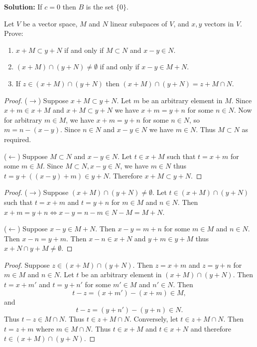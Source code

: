 \textbf{Solution: } If $c = 0$ then $B$ is the set $\{0\}$.


\begin{tcolorbox}[title=Problem 5, breakable]
    Let $V$ be a vector space, $M$ and $N$ linear subspaces of $V$, and $x, y$ vectors in $V$.
    Prove:
    \begin{enumerate}
        \item $x + M \subset y + N$ if and only if $M \subset N$ and $x - y \in N$.
        \item $(x + M) \cap (y + N) \ne \emptyset$ if and only if $x - y \in M + N$.
        \item If $z \in (x + M) \cap (y + N)$ then $(x + M) \cap (y + N) = z + M \cap N$.
    \end{enumerate}
\end{tcolorbox}

\begin{proof}
    ($\longrightarrow$) Suppose $x + M \subset y + N$.
    Let $m$ be an arbitrary element in $M$.
    Since $x + m \in x + M$ and $x + M \subset y + N$ we have $x + m = y + n$ for some $n \in N$.
    Now for arbitrary $m \in M$, we have $x + m = y + n$ for some $n \in N$, so $m = n - (x - y)$.
    Since $n \in N$ and $x - y \in N$ we have $m \in N$. Thus $M \subset N$ as required.

    ($\longleftarrow$) Suppose $M \subset N$ and $x - y \in N$.
    Let $t \in x + M$ such that $t = x + m$ for some $m \in M$.
    Since $M \subset N, x - y \in N$, we have $m \in N$ thus $t = y + ((x - y) + m) \in y + N$.
    Therefore $x + M \subset y + N$.
\end{proof}

\begin{proof}
    ($\longrightarrow$) Suppose $(x + M) \cap (y + N) \ne \emptyset$.
    Let $t \in (x + M) \cap (y + N)$ such that $t = x + m$ and $t = y + n$ for $m \in M$ and $n \in N$.
    Then $x + m = y + n \iff x - y = n - m \in N - M = M + N$.

    ($\longleftarrow$) Suppose $x - y \in M + N$. Then $x - y = m + n$ for some $m \in M$ and $n \in N$.
    Then $x - n = y + m$. Then $x - n \in x + N$ and $y + m \in y + M$ thus $x + N \cap y + M \ne \emptyset$.
\end{proof}

\begin{proof}
    Suppose $z \in (x + M) \cap (y + N)$.
    Then $z = x + m$ and $z = y + n$ for $m \in M$ and $n \in N$.
    Let $t$ be an arbitrary element in $(x + M) \cap (y + N)$.
    Then $t = x + m'$ and $t = y + n'$ for some $m' \in M$ and $n' \in N$.
    Then 
    \[t - z = (x + m') - (x + m) \in M,\]
    and 
    \[t - z = (y + n') - (y + n) \in N.\]
    Thus $t - z \in M \cap N$. Thus $t \in z + M \cap N$.
    Conversely, let $t \in z + M \cap N$.
    Then $t = z + m$ where $m \in M \cap N$.
    Thus $t \in x + M$ and $t \in x + N$ and therefore $t \in (x + M) \cap (y + N)$.
\end{proof}


